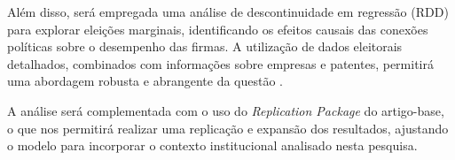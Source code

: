Além disso, será empregada uma análise de descontinuidade em regressão (RDD) para explorar eleições marginais, identificando os efeitos causais das conexões políticas sobre o desempenho das firmas. A utilização de dados eleitorais detalhados, combinados com informações sobre empresas e patentes, permitirá uma abordagem robusta e abrangente da questão \cite{Freitas2007UmaDD}.

A análise será complementada com o uso do \emph{Replication Package} do artigo-base, o que nos permitirá realizar uma replicação e expansão dos resultados, ajustando o modelo para incorporar o contexto institucional analisado nesta pesquisa.
